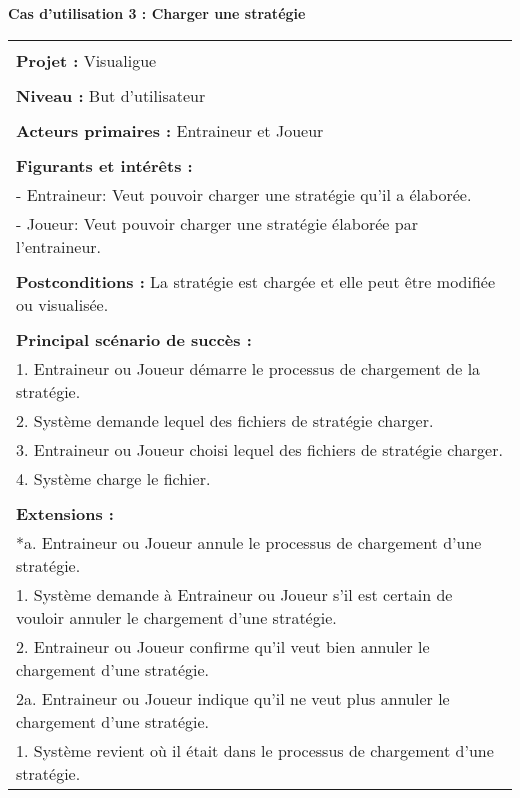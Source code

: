 \newpage
\begin{flushleft}
	\textbf{Cas d'utilisation 3 : Charger une stratégie}\\
\end{flushleft}
\begin{tabular}{|p{16cm}|}
	\hline
	\\
	\textbf{Projet :} Visualigue\\
	\\
	\textbf{Niveau :} But d'utilisateur\\
	\\
	\textbf{Acteurs primaires :} Entraineur et Joueur\\
	\\
	\textbf{Figurants et intérêts :} \\
	- Entraineur: Veut pouvoir charger une stratégie qu'il a élaborée.\\
	- Joueur: Veut pouvoir charger une stratégie élaborée par l'entraineur.\\
	\\
	\textbf{Postconditions :} La stratégie est chargée et elle peut être modifiée ou visualisée.\\
	\\
	\textbf{Principal scénario de succès :}\\
	1. Entraineur ou Joueur démarre le processus de chargement de la stratégie.\\
	2. Système demande lequel des fichiers de stratégie charger.\\
	3. Entraineur ou Joueur choisi lequel des fichiers de stratégie charger.\\
	4. Système charge le fichier.\\
	\\
	\textbf{Extensions :}\\
	*a. Entraineur ou Joueur annule le processus de chargement d'une stratégie.\\
	\hspace{1cm}1. Système demande à Entraineur ou Joueur s'il est certain de vouloir annuler le chargement d'une stratégie.\\
	\hspace{1cm}2. Entraineur ou Joueur confirme qu'il veut bien annuler le chargement d'une stratégie.\\
	\hspace{2cm}2a. Entraineur ou Joueur indique qu'il ne veut plus annuler le chargement d'une stratégie.\\
	\hspace{3cm}1. Système revient où il était dans le processus de chargement d'une stratégie.\\

\end{tabular}
